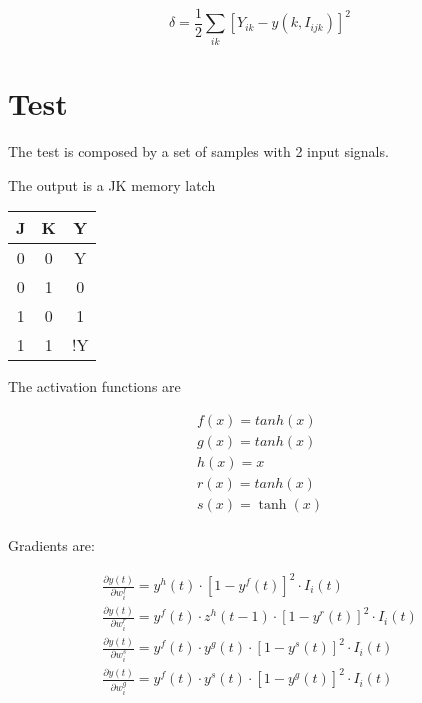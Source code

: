 \documentclass[a4paper,11pt]{article}
\begin{document}
\[
	\delta = \frac{1}{2} \sum_{ik} \left[ Y_{ik} - y(k, I_{ijk})\right] ^ 2
\]


\section{Test}

The test is composed by a set of samples with 2 input signals.

The output is a JK memory latch

\begin{tabular}{|c|c|c|}
	\hline J & K & Y \\ 
	\hline 0 & 0 & Y \\ 
	\hline 0 & 1 & 0 \\ 
	\hline 1 & 0 & 1 \\ 
	\hline 1 & 1 & !Y \\ 
	\hline 
\end{tabular}

The activation functions are

\[ 
\begin{array}{l}
f(x) = tanh(x) \\
g(x) = tanh(x) \\
h(x) = x \\
r(x) = tanh(x) \\
s(x) = \tanh(x) \\
\end{array}
\]

Gradients are:

\begin{eqnarray}
	\frac{\partial y(t)}{\partial w^f_i} = y^h(t) \cdot \left[ 1 - y^f(t)\right] ^2 \cdot I_i(t)
\\
	\frac{\partial y(t)}{\partial w^r_i} = y^f(t) \cdot z^h(t-1) \cdot
	\left[ 1 - y^r(t) \right]^2  \cdot I_i(t)
\\
	\frac{\partial y(t)}{\partial w^s_i} = y^f(t) \cdot y^g(t) \cdot \left[ 1 - y^s(t) \right]^2 \cdot I_i(t)
\\
	\frac{\partial y(t)}{\partial w^g_i} = y^f(t) \cdot y^s(t) \cdot \left[ 1 - y^g(t) \right]^2 \cdot I_i(t)
\end{eqnarray}
\end{document}
